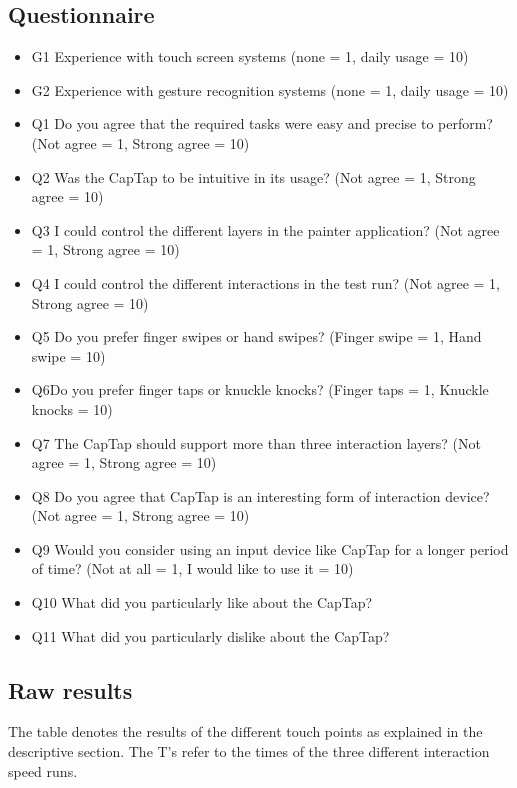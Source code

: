 \subsection{Questionnaire}
\begin{itemize}
\item G1 Experience with touch screen systems (none = 1, daily usage = 10)
\item G2 Experience with gesture recognition systems (none = 1, daily usage = 10)
\item Q1 Do you agree that the required tasks were easy and precise to perform? (Not agree = 1, Strong agree = 10)
\item Q2 Was the CapTap to be intuitive in its usage? (Not agree = 1, Strong agree = 10)
\item Q3 I could control the different layers in the painter application? (Not agree = 1, Strong agree = 10)
\item Q4 I could control the different interactions in the test run? (Not agree = 1, Strong agree = 10)
\item Q5 Do you prefer finger swipes or hand swipes?
(Finger swipe = 1, Hand swipe = 10)
\item Q6Do you prefer finger taps or knuckle knocks? (Finger taps = 1, Knuckle knocks = 10)
\item Q7 The CapTap should support more than three interaction layers? (Not agree = 1, Strong agree = 10)
\item Q8 Do you agree that CapTap is an interesting form of interaction device? (Not agree = 1, Strong agree = 10)
\item Q9 Would you consider using an input device like CapTap for a longer period of time? (Not at all = 1, I would like to use it = 10)
\item Q10 What did you particularly like about the CapTap?
\item Q11 What did you particularly dislike about the CapTap?
\end{itemize}

\subsection{Raw results}
The table denotes the results of the different touch points as explained in the descriptive section. The T's refer to the times of the three different interaction speed runs.

